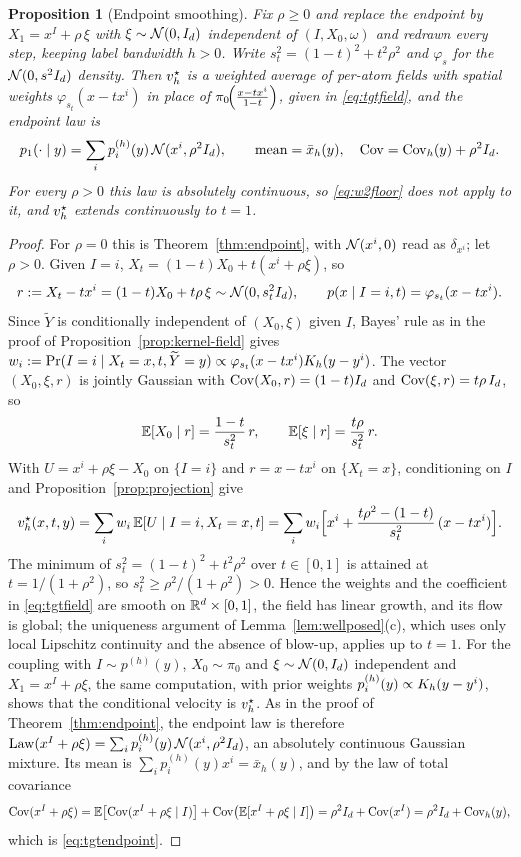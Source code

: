 \documentclass{article} %
\theoremstyle{plain}
\newtheorem{proposition}[theorem]{Proposition}
\theoremstyle{definition}
\theoremstyle{remark}
\begin{document}
\begin{proposition}[Endpoint smoothing]
\label{prop:tgtnoise}
Fix $\rho\ge0$ and replace the endpoint by $X_1=x^I+\rho\,\xi$ with $\xi\sim\mathcal{N}(0,I_d)$ independent
of $(I,X_0,\omega)$ and redrawn every step, keeping label bandwidth $h>0$. Write
$s_t^2=(1-t)^2+t^2\rho^2$ and $\varphi_s$ for the $\mathcal{N}(0,s^2I_d)$ density. Then $v_h^\star$ is a
weighted average of per-atom fields with spatial weights $\varphi_{s_t}(x-tx^i)$ in place of
$\pi_0\!\Big(\frac{x-tx^{i}}{1-t}\Big)$, given in \eqref{eq:tgtfield}, and the endpoint law is
\begin{equation}
p_1(\cdot\mid y)=\sum_i p_i^{(h)}(y)\,\mathcal{N}(x^i,\rho^2I_d),
\qquad
\text{mean}=\bar x_h(y),\quad \operatorname{Cov}=\operatorname{Cov}_h(y)+\rho^2I_d.
\label{eq:tgtendpoint}
\end{equation}
For every $\rho>0$ this law is absolutely continuous, so \eqref{eq:w2floor} does not apply to it,
and $v_h^\star$ extends continuously to $t=1$.
\end{proposition}

\begin{proof}
\label{apx:pf-tgtnoise}
For $\rho=0$ this is Theorem~\ref{thm:endpoint}, with $\mathcal{N}(x^i,0)$ read as $\delta_{x^i}$; let
$\rho>0$. Given $I=i$, $X_t=(1-t)X_0+t(x^i+\rho\xi)$, so
\[
r:=X_t-tx^i=(1-t)X_0+t\rho\,\xi\sim\mathcal{N}(0,s_t^2I_d),\qquad p(x\mid I=i,t)=\varphi_{s_t}(x-tx^i).
\]
Since $\widetilde Y$ is conditionally independent of $(X_0,\xi)$ given $I$, Bayes' rule as in the
proof of Proposition~\ref{prop:kernel-field} gives
$w_i:=\Pr(I=i\mid X_t=x,t,\widetilde Y=y)\propto\varphi_{s_t}(x-tx^i)K_h(y-y^{i})$. The vector
$(X_0,\xi,r)$ is jointly Gaussian with $\operatorname{Cov}(X_0,r)=(1-t)I_d$ and $\operatorname{Cov}(\xi,r)=t\rho\,I_d$, so
\[
\mathbb{E}[X_0\mid r]=\frac{1-t}{s_t^2}\,r,\qquad \mathbb{E}[\xi\mid r]=\frac{t\rho}{s_t^2}\,r .
\]
With $U=x^i+\rho\xi-X_0$ on $\{I=i\}$ and $r=x-tx^i$ on $\{X_t=x\}$, conditioning on $I$ and
Proposition~\ref{prop:projection} give
\begin{equation}
v_h^\star(x,t,y)=\sum_iw_i\,\mathbb{E}[U\mid I=i,X_t=x,t]
=\sum_iw_i\Big[x^i+\frac{t\rho^2-(1-t)}{s_t^2}\,(x-tx^i)\Big].
\label{eq:tgtfield}
\end{equation}
The minimum of $s_t^2=(1-t)^2+t^2\rho^2$ over $t\in[0,1]$ is attained at $t=1/(1+\rho^2)$, so
$s_t^2\ge\rho^2/(1+\rho^2)>0$. Hence the weights and the coefficient in \eqref{eq:tgtfield} are
smooth on $\mathbb{R}^d\times[0,1]$, the field has linear growth, and its flow is global; the uniqueness
argument of Lemma~\ref{lem:wellposed}(c), which uses only local Lipschitz continuity and the absence
of blow-up, applies up to $t=1$. For the coupling with $I\sim p^{(h)}(y)$, $X_0\sim\pi_0$ and
$\xi\sim\mathcal{N}(0,I_d)$ independent and $X_1=x^I+\rho\xi$, the same computation, with prior weights
$p^{(h)}_i(y)\propto K_h(y-y^{i})$, shows that the conditional velocity is $v_h^\star$. As in the proof of
Theorem~\ref{thm:endpoint}, the endpoint law is therefore $\mathrm{Law}(x^I+\rho\xi)=\sum_ip_i^{(h)}(y)\,
\mathcal{N}(x^i,\rho^2I_d)$, an absolutely continuous Gaussian mixture. Its mean is
$\sum_ip_i^{(h)}(y)x^i=\bar x_h(y)$, and by the law of total covariance
\[
\operatorname{Cov}(x^I+\rho\xi)=\mathbb{E}\bigl[\operatorname{Cov}(x^I+\rho\xi\mid I)\bigr]+\operatorname{Cov}\bigl(\mathbb{E}[x^I+\rho\xi\mid I]\bigr)
=\rho^2I_d+\operatorname{Cov}(x^I)=\rho^2I_d+\operatorname{Cov}_h(y),
\]
which is \eqref{eq:tgtendpoint}.
\end{proof}
\end{document}
